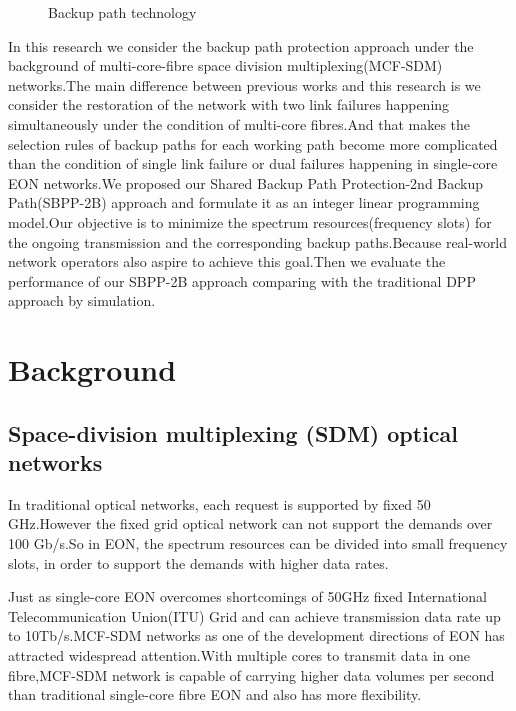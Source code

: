 \documentclass[a4paper,11pt]{report}
\begin{document}
    
        \begin{figure}[!h]
        \begin{center}
        \end{center}
        \caption{Backup path technology}
        \label{figure:backup(single)}
        \end{figure} 
    
    
    In this research we consider the backup path protection approach under the background of multi-core-fibre space division multiplexing(MCF-SDM) networks.The main difference between previous works and this research is we consider the restoration of the network with two link failures happening simultaneously under the condition of multi-core fibres.And that makes the selection rules of backup paths for each working path become more complicated than the condition of single link failure or dual failures happening in single-core EON networks.We proposed our Shared Backup Path Protection-2nd Backup Path(SBPP-2B) approach and formulate it as an integer linear programming \cite{gurobi} model.Our objective is to minimize the spectrum resources(frequency slots) for the ongoing transmission and the corresponding backup paths.Because real-world network operators also aspire to achieve this goal.Then we evaluate the performance of our SBPP-2B approach comparing with the traditional DPP approach by simulation.\par




\chapter{Background}
\section{Space-division multiplexing (SDM) optical networks}

    In traditional optical networks, each request is supported by fixed 50 GHz.However the fixed grid optical network can not support the demands over 100 Gb/s.So in EON, the spectrum resources can be divided into small frequency slots, in order to support the demands with higher data rates.\par

    Just as single-core EON overcomes shortcomings of 50GHz fixed International Telecommunication Union(ITU) Grid and can achieve transmission data rate up to 10Tb/s.MCF-SDM networks \cite{bl2015} \cite{th2011} \cite{js2012}as one of the development directions of EON has attracted widespread attention.With multiple cores to transmit data in one fibre,MCF-SDM network is capable of carrying higher data volumes per second than traditional single-core fibre EON and also has more flexibility.\par
\end{document}

